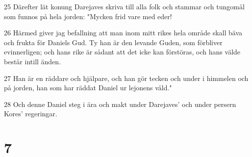 \par 25 Därefter lät konung Darejaves skriva till alla folk och stammar och tungomål som funnos på hela jorden: "Mycken frid vare med eder!
\par 26 Härmed giver jag befallning att man inom mitt rikes hela område skall bäva och frukta för Daniels Gud. Ty han är den levande Guden, som förbliver evinnerligen; och hans rike är sådant att det icke kan förstöras, och hans välde består intill änden.
\par 27 Han är en räddare och hjälpare, och han gör tecken och under i himmelen och på jorden, han som har räddat Daniel ur lejonens våld."
\par 28 Och denne Daniel steg i ära och makt under Darejaves' och under persern Kores' regeringar.

\chapter{7}

